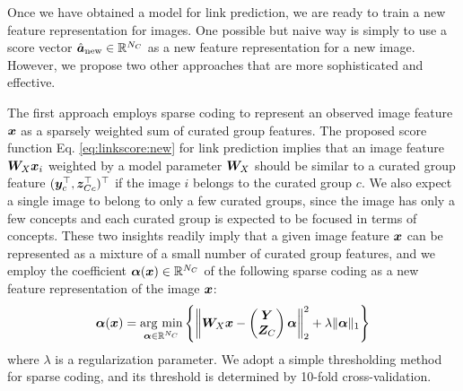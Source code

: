 \documentclass[letterpaper]{article} %
\newcommand{\argmin}{\mathop{\rm arg~min}\limits}
\begin{document}
Once we have obtained a model for link prediction, we are ready to train a new feature representation for images.
%
One possible but naive way is simply to use a score vector $\hat{\bm{a}}_{\rm{new}}\in\mathbb R^{N_C}$ as a new feature representation for a new image.
%
However, we propose two other approaches that are more sophisticated and effective.

The first approach employs sparse coding to represent an observed image feature $\bm{x}$ as a sparsely weighted sum of curated group features.
%
The proposed score function Eq. \eqref{eq:linkscore:new} for link prediction implies that an image feature $\bm{W}_X\bm{x}_i$ weighted by a model parameter $\bm{W}_X$ should be similar to a curated group feature $(\bm{y}_c^{\top},\bm{z}_{Cc}^{\top})^{\top}$ if the image $i$ belongs to the curated group $c$.
%
We also expect a single image to belong to only a few curated groups, since the image has only a few concepts and each curated group is expected to be focused in terms of concepts.
%
These two insights readily imply that a given image feature $\bm{x}$ can be represented as a mixture of a small number of curated group features, and we employ the coefficient $\bm{\alpha}(\bm{x})\in\mathbb R^{N_C}$ of the following sparse coding as a new feature representation of the image $\bm{x}$:
\begin{equation}
  \bm{\alpha}(\x)
  = \argmin_{\bm{\alpha}\in\bR^{N_C}} \left\{
    \left\|\W_X\x - \begin{pmatrix}\Y \\ \Z_C \end{pmatrix}
    \bm{\alpha} \right\|_2^2 + \lambda\|\bm{\alpha}\|_1 \right\}
\end{equation}
where $\lambda$ is a regularization parameter.
%
We adopt a simple thresholding method for sparse coding, and its threshold is determined by 10-fold cross-validation.
\end{document}
